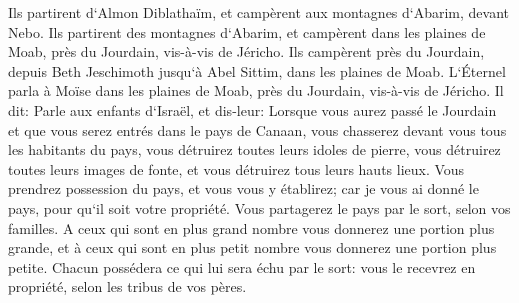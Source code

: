 \verse Ils partirent d`Almon Diblathaïm, et campèrent aux montagnes d`Abarim, devant Nebo. 
\verse Ils partirent des montagnes d`Abarim, et campèrent dans les plaines de Moab, près du Jourdain, vis-à-vis de Jéricho. 
\verse Ils campèrent près du Jourdain, depuis Beth Jeschimoth jusqu`à Abel Sittim, dans les plaines de Moab. 
\verse L`Éternel parla à Moïse dans les plaines de Moab, près du Jourdain, vis-à-vis de Jéricho. Il dit: 
\verse Parle aux enfants d`Israël, et dis-leur: Lorsque vous aurez passé le Jourdain et que vous serez entrés dans le pays de Canaan, 
\verse vous chasserez devant vous tous les habitants du pays, vous détruirez toutes leurs idoles de pierre, vous détruirez toutes leurs images de fonte, et vous détruirez tous leurs hauts lieux. 
\verse Vous prendrez possession du pays, et vous vous y établirez; car je vous ai donné le pays, pour qu`il soit votre propriété. 
\verse Vous partagerez le pays par le sort, selon vos familles. A ceux qui sont en plus grand nombre vous donnerez une portion plus grande, et à ceux qui sont en plus petit nombre vous donnerez une portion plus petite. Chacun possédera ce qui lui sera échu par le sort: vous le recevrez en propriété, selon les tribus de vos pères. 
